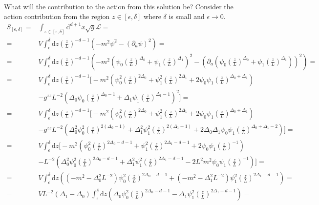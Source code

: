\documentclass[12pt]{report}
\renewcommand{\d}{\ensuremath{\mathrm{d}}}
\renewcommand{\L}{\ensuremath{\mathcal{L}}}
\begin{document}
\begin{appendices}
What will the contribution to the action from this solution be? Consider the action contribution from the region $z\in[\epsilon,\delta]$ where $\delta$ is small and $\epsilon\rightarrow0$.
\begin{equation}
\begin{split}
 S_{[\epsilon,\delta]}=&\int_{z\in[\epsilon,\delta]}\d^{d+1} x\sqrt{g}\L=\\
=&V\int_\epsilon^\delta\d z \left(\frac{z}{L}\right)^{-d-1}\left(-m^2\psi^2-(\partial_a\psi)^2\right)=\\
=&V\int_\epsilon^\delta\d z \left(\frac{z}{L}\right)^{-d-1}\left(-m^2( \psi_0\left(\frac{z}{L}\right)^{\Delta_0}+\psi_1\left(\frac{z}{L}\right)^{\Delta_1} )^2-(\partial_a(\psi_0\left(\frac{z}{L}\right)^{\Delta_0}+\psi_1\left(\frac{z}{L}\right)^{\Delta_1}))^2\right)=\\
=&V\int_\epsilon^\delta\d z \left(\frac{z}{L}\right)^{-d-1}\Big[-m^2 \left(\psi_0^2\left(\frac{z}{L}\right)^{2\Delta_0}+\psi_1^2\left(\frac{z}{L}\right)^{2\Delta_1}+2\psi_0\psi_1\left(\frac{z}{L}\right)^{\Delta_0+\Delta_1}\right) \\
&-g^{zz}L^{-2}(\Delta_0\psi_0\left(\frac{z}{L}\right)^{\Delta_0-1}+\Delta_1\psi_1\left(\frac{z}{L}\right)^{\Delta_1-1})^2\Big]=\\
=&V\int_\epsilon^\delta\d z\left(\frac{z}{L}\right)^{-d-1}\Big[-m^2 \left(\psi_0^2\left(\frac{z}{L}\right)^{2\Delta_0}+\psi_1^2\left(\frac{z}{L}\right)^{2\Delta_1}+2\psi_0\psi_1\left(\frac{z}{L}\right)^{\Delta_0+\Delta_1}\right)\\
&-g^{zz}L^{-2}\left(\Delta_0^2\psi_0^2\left(\frac{z}{L}\right)^{2(\Delta_0-1)}+\Delta_1^2\psi_1^2\left(\frac{z}{L}\right)^{2(\Delta_1-1)}+
2\Delta_0\Delta_1\psi_0\psi_1\left(\frac{z}{L}\right)^{\Delta_0+\Delta_1-2}\right)\Big]=\\
=&V\int_\epsilon^\delta\d z\Big[-m^2 \left(\psi_0^2\left(\frac{z}{L}\right)^{2\Delta_0-d-1}+\psi_1^2\left(\frac{z}{L}\right)^{2\Delta_1-d-1}+2\psi_0\psi_1\left(\frac{z}{L}\right)^{-1}\right)\\
&-L^{-2}\left(\Delta_0^2\psi_0^2\left(\frac{z}{L}\right)^{2\Delta_0-d-1}+\Delta_1^2\psi_1^2\left(\frac{z}{L}\right)^{2\Delta_1-d-1}-
2L^2m^2\psi_0\psi_1\left(\frac{z}{L}\right)^{-1}\right)\Big]=\\
=&V\int_\epsilon^\delta\d z \left((-m^2-\Delta_0^2L^{-2})\psi_0^2\left(\frac{z}{L}\right)^{2\Delta_0-d-1}+(-m^2-\Delta_1^2L^{-2})\psi_1^2\left(\frac{z}{L}\right)^{2\Delta_1-d-1}\right)=\\
=&VL^{-2}(\Delta_1-\Delta_0)\int_\epsilon^\delta\d z \left(\Delta_0\psi_0^2\left(\frac{z}{L}\right)^{2\Delta_0-d-1}-\Delta_1\psi_1^2\left(\frac{z}{L}\right)^{2\Delta_1-d-1}\right)=\\

\end{split}
\end{equation}
\end{appendices}
\end{document}
